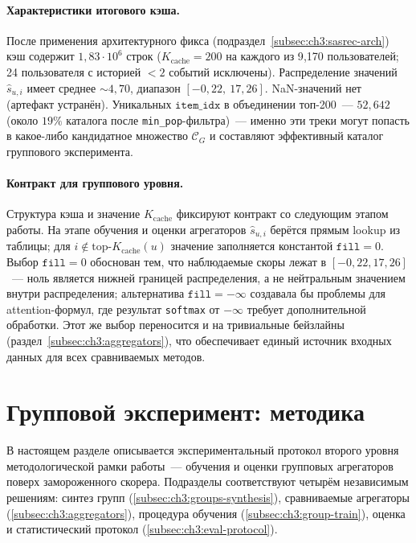 \paragraph{Характеристики итогового кэша.} После применения архитектурного фикса (подраздел~\ref{subsec:ch3:sasrec-arch}) кэш содержит $1{,}83 \cdot 10^6$ строк ($K_{\mathrm{cache}} = 200$ на каждого из 9{,}170 пользователей; 24 пользователя с историей $<2$ событий исключены). Распределение значений $\hat{s}_{u, i}$ имеет среднее $\sim 4{,}70$, диапазон $[-0{,}22,\ 17{,}26]$. NaN-значений нет (артефакт устранён). Уникальных $\mathtt{item\_idx}$ в объединении топ-200~--- $52{,}642$ (около $19\%$ каталога после \texttt{min\_pop}-фильтра)~--- именно эти треки могут попасть в какое-либо кандидатное множество $\mathcal{C}_G$ и составляют эффективный каталог группового эксперимента.

\paragraph{Контракт для группового уровня.} Структура кэша и значение $K_{\mathrm{cache}}$ фиксируют контракт со следующим этапом работы. На этапе обучения и оценки агрегаторов $\hat{s}_{u, i}$ берётся прямым lookup из таблицы; для $i \notin \mathrm{top}\text{-}K_{\mathrm{cache}}(u)$ значение заполняется константой $\mathtt{fill} = 0$. Выбор $\mathtt{fill} = 0$ обоснован тем, что наблюдаемые скоры лежат в $[-0{,}22, 17{,}26]$~--- ноль является нижней границей распределения, а не нейтральным значением внутри распределения; альтернатива $\mathtt{fill} = -\infty$ создавала бы проблемы для attention-формул, где результат \texttt{softmax} от $-\infty$ требует дополнительной обработки. Этот же выбор переносится и на тривиальные бейзлайны (раздел~\ref{subsec:ch3:aggregators}), что обеспечивает единый источник входных данных для всех сравниваемых методов.

\section{Групповой эксперимент: методика}\label{sec:ch3:group-method}

В настоящем разделе описывается экспериментальный протокол второго уровня методологической рамки работы~--- обучения и оценки групповых агрегаторов поверх замороженного скорера. Подразделы соответствуют четырём независимым решениям: синтез групп (\ref{subsec:ch3:groups-synthesis}), сравниваемые агрегаторы (\ref{subsec:ch3:aggregators}), процедура обучения (\ref{subsec:ch3:group-train}), оценка и статистический протокол (\ref{subsec:ch3:eval-protocol}).

